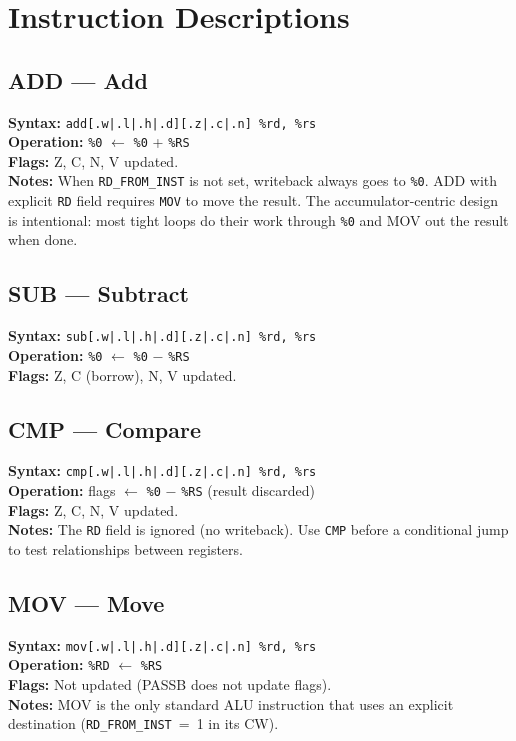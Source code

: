 \documentclass[a4paper,12pt]{report}
\newcommand{\asm}[1]{\texttt{#1}}
\newcommand{\field}[1]{\texttt{\small #1}}
\newcommand{\reg}[1]{\texttt{\%#1}}
\begin{document}
\section{Instruction Descriptions}

\subsection*{ADD --- Add}
\textbf{Syntax:} \asm{add[.w|.l|.h|.d][.z|.c|.n] \%rd, \%rs} \\
\textbf{Operation:} \reg{0} $\leftarrow$ \reg{0} + \reg{RS} \\
\textbf{Flags:} Z, C, N, V updated. \\
\textbf{Notes:} When \field{RD\_FROM\_INST} is not set, writeback always goes to \reg{0}. ADD with explicit \field{RD} field requires \asm{MOV} to move the result. The accumulator-centric design is intentional: most tight loops do their work through \reg{0} and MOV out the result when done.

\subsection*{SUB --- Subtract}
\textbf{Syntax:} \asm{sub[.w|.l|.h|.d][.z|.c|.n] \%rd, \%rs} \\
\textbf{Operation:} \reg{0} $\leftarrow$ \reg{0} $-$ \reg{RS} \\
\textbf{Flags:} Z, C (borrow), N, V updated.

\subsection*{CMP --- Compare}
\textbf{Syntax:} \asm{cmp[.w|.l|.h|.d][.z|.c|.n] \%rd, \%rs} \\
\textbf{Operation:} flags $\leftarrow$ \reg{0} $-$ \reg{RS} (result discarded) \\
\textbf{Flags:} Z, C, N, V updated. \\
\textbf{Notes:} The \field{RD} field is ignored (no writeback). Use \asm{CMP} before a conditional jump to test relationships between registers.

\subsection*{MOV --- Move}
\textbf{Syntax:} \asm{mov[.w|.l|.h|.d][.z|.c|.n] \%rd, \%rs} \\
\textbf{Operation:} \reg{RD} $\leftarrow$ \reg{RS} \\
\textbf{Flags:} Not updated (PASSB does not update flags). \\
\textbf{Notes:} MOV is the only standard ALU instruction that uses an explicit destination (\field{RD\_FROM\_INST}~=~1 in its CW).
\end{document}
